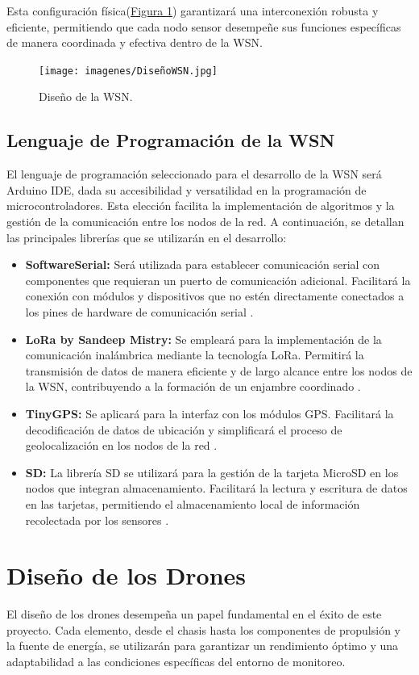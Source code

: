Esta configuración física(\hyperref[diseñowsn]{Figura \ref{diseñowsn}}) garantizará una interconexión robusta y eficiente, permitiendo que cada nodo sensor desempeñe sus funciones específicas de manera coordinada y efectiva dentro de la WSN.
\begin{figure}[H]
    \centering
    \texttt{[image: imagenes/DiseñoWSN.jpg]}
    \caption{Diseño de la WSN.}
    \label{diseñowsn}
\end{figure}
\subsection{Lenguaje de Programación de la WSN}
El lenguaje de programación seleccionado para el desarrollo de la WSN será Arduino IDE, dada su accesibilidad y versatilidad en la programación de microcontroladores. Esta elección facilita la implementación de algoritmos y la gestión de la comunicación entre los nodos de la red. A continuación, se detallan las principales librerías que se utilizarán en el desarrollo:
\begin{itemize}
\item \textbf{SoftwareSerial:} Será utilizada para establecer comunicación serial con componentes que requieran un puerto de comunicación adicional. Facilitará la conexión con módulos y dispositivos que no estén directamente conectados a los pines de hardware de comunicación serial \cite{sslibrary}.
\item \textbf{LoRa by Sandeep Mistry:} Se empleará para la implementación de la comunicación inalámbrica mediante la tecnología LoRa. Permitirá la transmisión de datos de manera eficiente y de largo alcance entre los nodos de la WSN, contribuyendo a la formación de un enjambre coordinado \cite{loralibrary}.
\item \textbf{TinyGPS:} Se aplicará para la interfaz con los módulos GPS. Facilitará la decodificación de datos de ubicación y simplificará el proceso de geolocalización en los nodos de la red \cite{tinygpslibrary}.
\item \textbf{SD:} La librería SD se utilizará para la gestión de la tarjeta MicroSD en los nodos que integran almacenamiento. Facilitará la lectura y escritura de datos en las tarjetas, permitiendo el almacenamiento local de información recolectada por los sensores \cite{sdlibrary}.
\end{itemize}

\newpage
\section{Diseño de los Drones }
El diseño de los drones desempeña un papel fundamental en el éxito de este proyecto. Cada elemento, desde el chasis hasta los componentes de propulsión y la fuente de energía, se utilizarán para garantizar un rendimiento óptimo y una adaptabilidad a las condiciones específicas del entorno de monitoreo.
